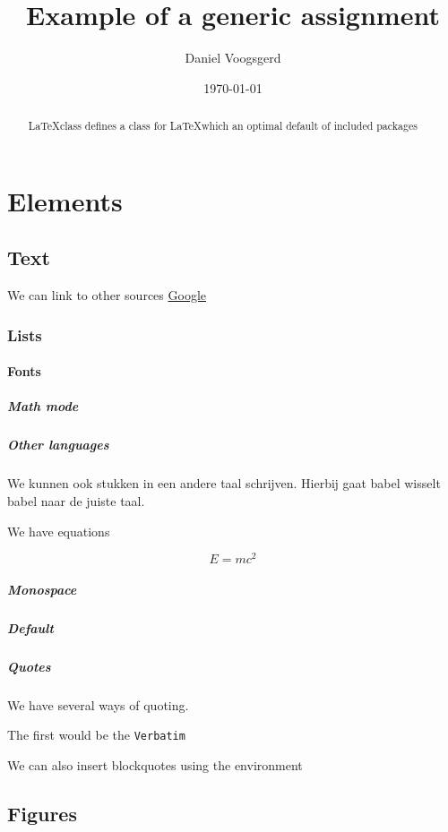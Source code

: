 \documentclass{uniarticle}
\title{Example of a generic assignment}
\date{\today}
\author{Daniel Voogsgerd}
\begin{document}
\maketitle


\begin{abstract}
    \LaTeX class defines a class for \LaTeX which an optimal default of
    included packages
\end{abstract}

\section{Elements}

\subsection{Text}

We can link to other sources \href{https://google.com}{Google}

\subsubsection{Lists}

\paragraph{Fonts}

\subparagraph{Math mode}

\subparagraph{Other languages}

\foreignlanguage{dutch}{
    We kunnen ook stukken in een andere taal schrijven. Hierbij gaat babel
    wisselt babel naar de juiste taal.
}

We have equations

\begin{equation}
    E = mc^2
\end{equation}

\subparagraph{Monospace}

\subparagraph{Default}

\subparagraph{Quotes}

We have several ways of quoting.

The first would be the \verb|Verbatim|

We can also insert blockquotes using the environment

\subsection{Figures}
\end{document}
